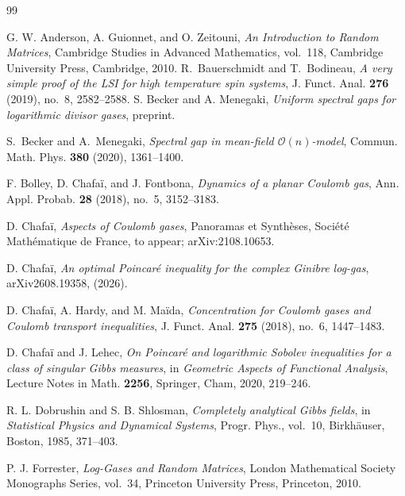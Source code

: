\documentclass[12pt,reqno,letterpaper]{amsart}
\theoremstyle{definition}
\theoremstyle{remark}
\numberwithin{equation}{section}
\begin{document}
\begin{thebibliography}{99}

G. W. Anderson, A. Guionnet, and O. Zeitouni,
\emph{An Introduction to Random Matrices},
Cambridge Studies in Advanced Mathematics, vol.~118, Cambridge University
Press, Cambridge, 2010.
R.~Bauerschmidt and T.~Bodineau,
\emph{A very simple proof of the LSI for high temperature spin systems},
J. Funct. Anal. \textbf{276} (2019), no.~8, 2582--2588.
S. Becker and A. Menegaki,
\emph{Uniform spectral gaps for logarithmic divisor gases}, preprint.




S.~Becker and A.~Menegaki,
\emph{Spectral gap in mean-field $\mathcal{O}(n)$-model},
Commun. Math. Phys. \textbf{380} (2020), 1361--1400.






F. Bolley, D. Chafa\"i, and J. Fontbona,
\emph{Dynamics of a planar Coulomb gas},
Ann. Appl. Probab. \textbf{28} (2018), no.~5, 3152--3183.

D. Chafa\"i,
\emph{Aspects of Coulomb gases},
Panoramas et Synth\`eses, Soci\'et\'e Math\'ematique de France,
to appear; arXiv:2108.10653.

D. Chafaï,
\textit{An optimal Poincaré inequality for the complex Ginibre log-gas},
arXiv{2608.19358}, (2026).

D. Chafa\"i, A. Hardy, and M. Ma\"ida,
\emph{Concentration for Coulomb gases and Coulomb transport inequalities},
J. Funct. Anal. \textbf{275} (2018), no.~6, 1447--1483.

D. Chafa\"i and J. Lehec,
\emph{On Poincar\'e and logarithmic Sobolev inequalities for a class of
singular Gibbs measures},
in \emph{Geometric Aspects of Functional Analysis},
Lecture Notes in Math. \textbf{2256}, Springer, Cham, 2020, 219--246.

R. L. Dobrushin and S. B. Shlosman,
\emph{Completely analytical Gibbs fields},
in \emph{Statistical Physics and Dynamical Systems},
Progr. Phys., vol.~10, Birkh\"auser, Boston, 1985, 371--403.


P. J. Forrester,
\emph{Log-Gases and Random Matrices},
London Mathematical Society Monographs Series, vol.~34, Princeton University
Press, Princeton, 2010.



\end{thebibliography}
\end{document}
